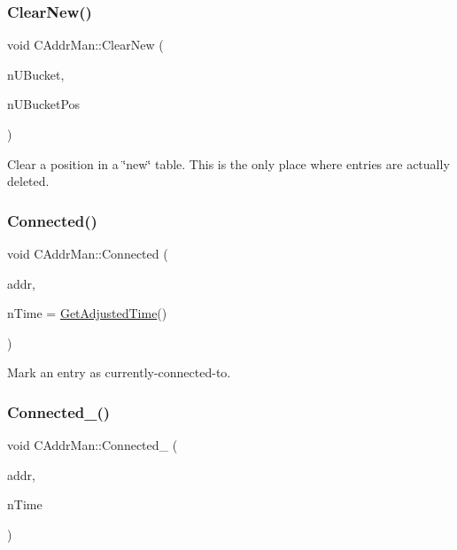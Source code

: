 \mbox{\label{class_c_addr_man_ab283de3e750f006c85573976bd40da81}} 
\subsubsection{\texorpdfstring{Clear\+New()}{ClearNew()}}
{\footnotesize\ttfamily void C\+Addr\+Man\+::\+Clear\+New (\begin{DoxyParamCaption}\item[{int}]{n\+U\+Bucket,  }\item[{int}]{n\+U\+Bucket\+Pos }\end{DoxyParamCaption})\hspace{0.3cm}{\ttfamily [protected]}}



Clear a position in a \char`\"{}new\char`\"{} table. This is the only place where entries are actually deleted. 

\mbox{\label{class_c_addr_man_a7aba66d9e9527522fed974567d34c322}} 
\subsubsection{\texorpdfstring{Connected()}{Connected()}}
{\footnotesize\ttfamily void C\+Addr\+Man\+::\+Connected (\begin{DoxyParamCaption}\item[{const \mbox{\hyperlink{class_c_service}{C\+Service}} \&}]{addr,  }\item[{int64\+\_\+t}]{n\+Time = {\ttfamily \mbox{\hyperlink{timedata_8h_a09f81b9c7650f898cf3cf305b87547e6}{Get\+Adjusted\+Time}}()} }\end{DoxyParamCaption})\hspace{0.3cm}{\ttfamily [inline]}}



Mark an entry as currently-\/connected-\/to. 

\mbox{\label{class_c_addr_man_a1ae72643c51293f3f3345e74ce0368ca}} 
\subsubsection{\texorpdfstring{Connected\+\_\+()}{Connected\_()}}
{\footnotesize\ttfamily void C\+Addr\+Man\+::\+Connected\+\_\+ (\begin{DoxyParamCaption}\item[{const \mbox{\hyperlink{class_c_service}{C\+Service}} \&}]{addr,  }\item[{int64\+\_\+t}]{n\+Time }\end{DoxyParamCaption})\hspace{0.3cm}{\ttfamily [protected]}}



